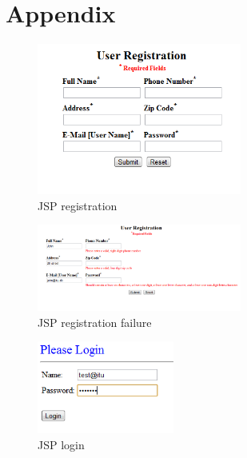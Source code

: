 \section{Appendix}
\label{sec.appendix}

\begin{figure}[H]
    \begin{center}
        \includegraphics[width=0.6\textwidth]{fig/jsp_registration.png}
        \caption{JSP registration}
        \label{fig.jsp_index}
    \end{center}
\end{figure}

\begin{figure}[H]
    \begin{center}
        \includegraphics[width=0.6\textwidth]{fig/jsp_fail_reg.png}
        \caption{JSP registration failure}
        \label{fig.jsp_index}
    \end{center}
\end{figure}

\begin{figure}[H]
    \begin{center}
        \includegraphics[width=0.4\textwidth]{fig/jsp_login.png}
        \caption{JSP login}
        \label{fig.jsp_index}
    \end{center}
\end{figure}

